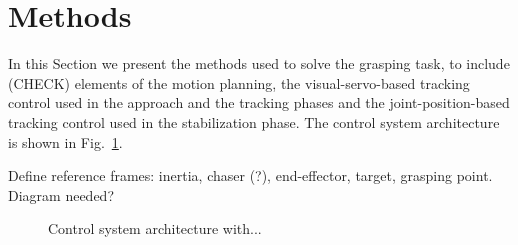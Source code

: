 \section{Methods}
%
In this Section we present the methods used to solve the grasping task, to include (CHECK) elements of the motion planning, the visual-servo-based tracking control used in the approach and the tracking phases and the joint-position-based tracking control used in the stabilization phase. The control system architecture is shown in Fig.~\ref{fig:blockdiagram}.

Define reference frames: inertia, chaser (?), end-effector, target, grasping point. Diagram needed?
%
\begin{figure}
\centering  	\label{fig_1}

\caption{Control system architecture with...}
\label{fig:blockdiagram}
\end{figure}
%
%
%
%
%
%
%
